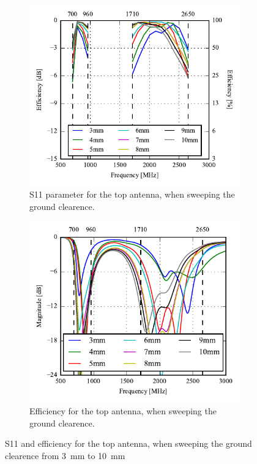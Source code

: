 \begin{figure}[htbp]
   \begin{subfigure}[b]{0.49\linewidth}
        \centering
        \includegraphics{img/tech_sol/monopole/5mm/eff_5mm}
        \caption{S11 parameter for the top antenna, when sweeping the ground clearence.}
        \label{fig:s11_mono_sim_5mm}
    \end{subfigure}
    \hfill
    \begin{subfigure}[b]{0.49\linewidth}
        \centering
        \includegraphics{img/tech_sol/monopole/5mm/s11_5mm}
        \caption{Efficiency for the top antenna, when sweeping the ground clearence.}
        \label{fig:eff_mono_sim_5mm}
    \end{subfigure}
    \caption{S11 and efficiency for the top antenna, when sweeping the ground clearence from \SI{3}{mm} to \SI{10}{mm}}
    \label{fig:eff_s11_mono_sim_5mm}
\end{figure}

